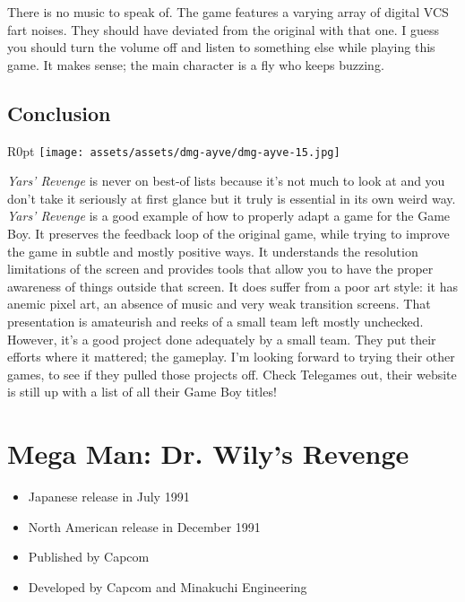 \documentclass{book}
\begin{document}
There is no music to speak of. The game features a varying array of digital VCS fart noises. They should have deviated from the original with that one. I guess you should turn the volume off and listen to something else while playing this game. It makes sense; the main character is a fly who keeps buzzing.

\FloatBarrier\needspace{5pt}\section*{Conclusion}\nopagebreak[4]

\begin{wrapfigure}{R}{0pt} \texttt{[image: assets/assets/dmg-ayve/dmg-ayve-15.jpg]}\end{wrapfigure}
\emph{Yars’ Revenge} is never on best-of lists because it’s not much to look at and you don’t take it seriously at first glance but it truly is essential in its own weird way. \emph{Yars’ Revenge} is a good example of how to properly adapt a game for the Game Boy. It preserves the feedback loop of the original game, while trying to improve the game in subtle and mostly positive ways. It understands the resolution limitations of the screen and provides tools that allow you to have the proper awareness of things outside that screen. It does suffer from a poor art style: it has anemic pixel art, an absence of music and very weak transition screens. That presentation is amateurish and reeks of a small team left mostly unchecked. However, it’s a good project done adequately by a small team. They put their efforts where it mattered; the gameplay. I’m looking forward to trying their other games, to see if they pulled those projects off. Check Telegames out, their website is still up with a list of all their Game Boy titles!


\begingroup \chapter*{Mega Man: Dr. Wily’s Revenge} \endgroup

\begin{itemize} \setlength\itemsep{-0.4em}
\item Japanese release in July 1991
\item North American release in December 1991
\item Published by Capcom
\item Developed by Capcom and Minakuchi Engineering
\end{itemize}\noindent
\end{document}
